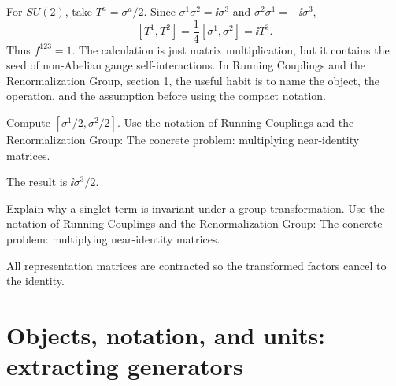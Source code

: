 \begin{example}
For \(SU(2)\), take \(T^a=\sigma^a/2\).  Since \(\sigma^1\sigma^2=\ii\sigma^3\) and \(\sigma^2\sigma^1=-\ii\sigma^3\),
\[
  [T^1,T^2]=\frac14[\sigma^1,\sigma^2]=\ii T^3.
\]
Thus \(f^{123}=1\).  The calculation is just matrix multiplication, but it contains the seed of non-Abelian gauge self-interactions.  In Running Couplings and the Renormalization Group, section 1, the useful habit is to name the object, the operation, and the assumption before using the compact notation.
\end{example}



\begin{exercise}
Compute \([\sigma^1/2,\sigma^2/2]\).  Use the notation of Running Couplings and the Renormalization Group: The concrete problem: multiplying near-identity matrices.
\begin{answer}
The result is \(\ii\sigma^3/2\).
\end{answer}
\end{exercise}

\begin{exercise}
Explain why a singlet term is invariant under a group transformation.  Use the notation of Running Couplings and the Renormalization Group: The concrete problem: multiplying near-identity matrices.
\begin{answer}
All representation matrices are contracted so the transformed factors cancel to the identity.
\end{answer}
\end{exercise}



\section{Objects, notation, and units: extracting generators}














